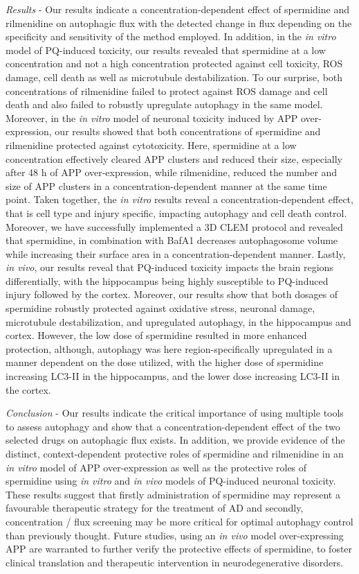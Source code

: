 \textit{Results} - Our results indicate a concentration-dependent effect of spermidine and rilmenidine on autophagic flux with the detected change in flux depending on the specificity and sensitivity of the method employed.  In addition, in the \textit{in vitro} model of PQ-induced toxicity, our results revealed that spermidine at a low concentration and not a high concentration protected against cell toxicity, ROS damage, cell death as well as microtubule destabilization. To our surprise, both concentrations of rilmenidine failed to protect against ROS damage and cell death and also failed to robustly upregulate autophagy in the same model.  Moreover, in the \textit{in vitro} model of neuronal toxicity induced by APP over-expression, our results showed that both concentrations of spermidine and rilmenidine protected against cytotoxicity. Here, spermidine at a low concentration effectively cleared APP clusters and reduced their size, especially after 48 h of APP over-expression, while rilmenidine, reduced the number and size of APP clusters in a concentration-dependent manner at the same time point.  
Taken together, the \textit{in vitro} results reveal a concentration-dependent effect, that is cell type and injury specific, impacting autophagy and cell death control. Moreover, we have successfully implemented a 3D CLEM protocol and revealed that spermidine, in combination with BafA1 decreases autophagosome volume while increasing their surface area in a concentration-dependent manner. Lastly, \textit{in vivo}, our results reveal that PQ-induced toxicity impacts the brain regions differentially, with the hippocampus being highly susceptible to PQ-induced injury followed by the cortex. Moreover, our results show that both dosages of spermidine robustly protected against oxidative stress, neuronal damage, microtubule destabilization, and upregulated autophagy, in the hippocampus and cortex. However, the low dose of spermidine resulted in more enhanced protection, although, autophagy was here region-specifically upregulated in a manner dependent on the dose utilized, with the higher dose of spermidine increasing LC3-II in the hippocampus, and the lower dose increasing LC3-II in the cortex. 

\textit{Conclusion} - Our results indicate the critical importance of using multiple tools to assess autophagy and show that a concentration-dependent effect of the two selected drugs on autophagic flux exists. In addition, we provide evidence of the distinct, context-dependent protective roles of spermidine and rilmenidine in an \textit{in vitro} model of APP over-expression as well as the protective roles of spermidine using \textit{in vitro} and \textit{in vivo} models of PQ-induced neuronal toxicity. These results suggest that firstly administration of spermidine may represent a favourable therapeutic strategy for the treatment of AD and secondly, concentration / flux screening may be more critical for optimal autophagy control than previously thought. Future studies, using an \textit{in vivo} model over-expressing APP are warranted to further verify the protective effects of spermidine, to foster clinical translation and therapeutic intervention in neurodegenerative disorders. 

